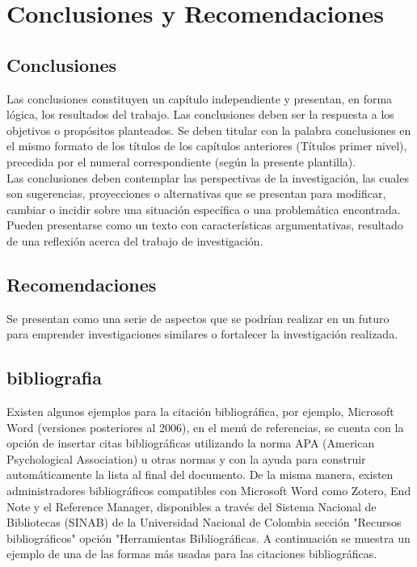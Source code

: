 \chapter{Conclusiones y Recomendaciones}
\section{Conclusiones}

Las conclusiones constituyen un capítulo independiente y presentan, en forma lógica, los resultados del trabajo. Las conclusiones deben ser la respuesta a los objetivos o propósitos planteados. Se deben titular con la palabra conclusiones en el mismo formato de los títulos de los capítulos anteriores (Títulos primer nivel), precedida por el numeral correspondiente (según la presente plantilla). \\

Las conclusiones deben contemplar las perspectivas de la investigación, las cuales son sugerencias, proyecciones o alternativas que se presentan para modificar, cambiar o incidir sobre una situación específica o una problemática encontrada. Pueden presentarse como un texto con características argumentativas, resultado de una reflexión acerca del trabajo de investigación. 


\section{Recomendaciones}

Se presentan como una serie de aspectos que se podrían realizar en un futuro para emprender investigaciones similares o fortalecer la investigación realizada.

\section{bibliografia}

Existen algunos ejemplos para la citaci\'{o}n bibliogr\'{a}fica, por ejemplo, Microsoft Word (versiones posteriores al 2006), en el  men\'{u} de referencias, se cuenta con la opci\'{o}n de insertar citas bibliogr\'{a}ficas utilizando la norma APA (American Psychological Association) u otras normas y con la ayuda para construir autom\'{a}ticamente la lista al final del documento. De la misma manera, existen administradores bibliogr\'{a}ficos compatibles con Microsoft Word como Zotero, End Note y el Reference Manager,  disponibles a trav\'{e}s del Sistema Nacional de Bibliotecas (SINAB) de la Universidad Nacional de Colombia secci\'{o}n "Recursos bibliogr\'{a}ficos" opci\'{o}n "Herramientas Bibliogr\'{a}ficas. A continuaci\'{o}n se muestra un ejemplo de una de las formas m\'{a}s usadas para las citaciones bibliogr\'{a}ficas.\\


